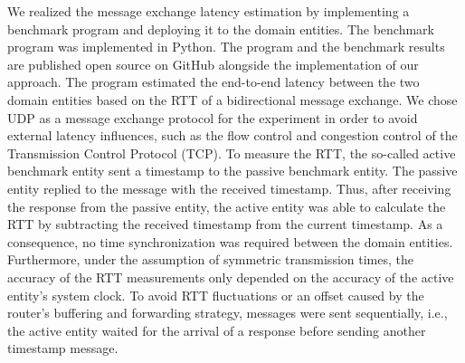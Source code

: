 We realized the message exchange latency estimation by implementing a benchmark program and deploying it to the domain entities.
The benchmark program was implemented in Python.
The program and the benchmark results are published open source on GitHub \cite{gitcasc} alongside the implementation of our approach.
The program estimated the end-to-end latency between the two domain entities based on the RTT of a bidirectional message exchange.
We chose UDP as a message exchange protocol for the experiment in order to avoid external latency influences, such as the flow control and congestion control of the Transmission Control Protocol (TCP).
To measure the RTT, the so-called active benchmark entity sent a timestamp to the passive benchmark entity.
The passive entity replied to the message with the received timestamp.
Thus, after receiving the response from the passive entity, the active entity was able to calculate the RTT by subtracting the received timestamp from the current timestamp.
As a consequence, no time synchronization was required between the domain entities.
Furthermore, under the assumption of symmetric transmission times, the accuracy of the RTT measurements only depended on the accuracy of the active entity's system clock.
To avoid RTT fluctuations or an offset caused by the router's buffering and forwarding strategy, messages were sent sequentially, i.e., the active entity waited for the arrival of a response before sending another timestamp message.

